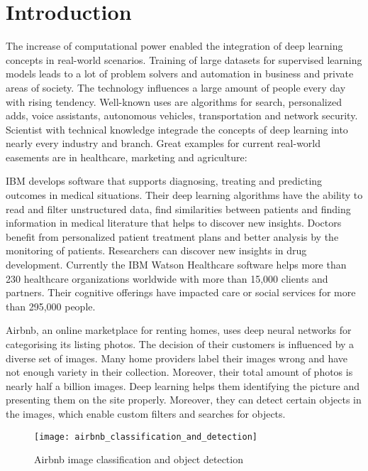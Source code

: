 \chapter{Introduction}

The increase of computational power enabled the integration of deep learning concepts in real-world scenarios.
Training of large datasets for supervised learning models leads to a lot of problem solvers and automation in business and private areas of society.
The technology influences a large amount of people every day with rising tendency.
Well-known uses are algorithms for search, personalized adds, voice assistants, autonomous vehicles, transportation and network security.
\hfill \break
Scientist with technical knowledge integrade the concepts of deep learning into nearly every industry and branch.
Great examples for current real-world easements are in healthcare, marketing and agriculture:

IBM develops software that supports diagnosing, treating and predicting outcomes in medical situations.
Their deep learning algorithms have the ability to read and filter unstructured data, find similarities between patients and finding information in medical literature that helps to discover new insights.
Doctors benefit from personalized patient treatment plans and better analysis by the monitoring of patients. Researchers can discover new insights in drug development.
Currently the IBM Watson Healthcare software helps more than 230 healthcare organizations worldwide with more than 15,000 clients and partners. Their cognitive offerings have impacted care or social services for more than 295,000 people.
\cite{ibm-watson-healthcare, ibm-watson-facts}

Airbnb, an online marketplace for renting homes, uses deep neural networks for categorising its listing photos.
The decision of their customers is influenced by a diverse set of images.
Many home providers label their images wrong and have not enough variety in their collection.
Moreover, their total amount of photos is nearly half a billion images.
Deep learning helps them identifying the picture and presenting them on the site properly.
Moreover, they can detect certain objects in the images, which enable custom filters and searches for objects.
\cite{airbnb-ic-video, airbnb-ic-blog}

\begin{figure}[H]
    \centering
    \texttt{[image: airbnb\_classification\_and\_detection]}
    \caption{\cite{airbnb_image_classification, airbnb_object_detection} Airbnb image classification and object detection}
    \label{fig:airbnb_image_classification}
\end{figure}

